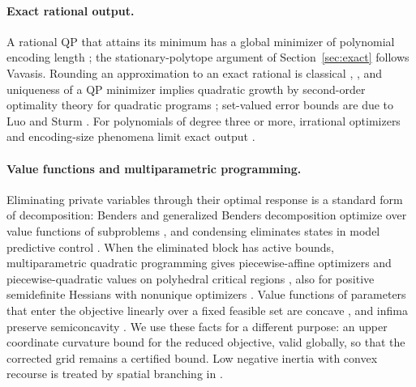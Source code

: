 \paragraph{Exact rational output.}
A rational QP that attains its minimum has a global minimizer of polynomial
encoding length \cite{Vavasis1990,DelPiaDeyMolinaro2017}; the stationary-polytope
argument of Section~\ref{sec:exact} follows Vavasis. Rounding an approximation
to an exact rational is classical
\cite[Section~5.1]{GrotschelLovaszSchrijver1988}, \cite{KozlovTarasovKhachiyan1980},
and uniqueness of a QP minimizer implies quadratic growth by second-order
optimality theory for quadratic programs \cite{Contesse1980}; set-valued error
bounds are due to Luo and Sturm \cite{LuoSturm2000}. For polynomials of degree
three or more, irrational optimizers and encoding-size phenomena limit exact
output \cite{BienstockDelPiaHildebrand2023}.

\paragraph{Value functions and multiparametric programming.}
Eliminating private variables through their optimal response is a standard
form of decomposition: Benders and generalized Benders decomposition optimize
over value functions of subproblems \cite{Benders1962,Geoffrion1972}, and
condensing eliminates states in model predictive control
\cite{BockPlitt1984,JerezKerriganConstantinides2012,Axehill2015}. When the
eliminated block has active bounds, multiparametric quadratic programming
gives piecewise-affine optimizers and piecewise-quadratic values on polyhedral
critical regions \cite{BemporadEtAl2002,TondelJohansenBemporad2003}, also for
positive semidefinite Hessians with nonunique optimizers
\cite{SpjotvoldTondelJohansen2007,PatrinosSarimveis2011}. Value functions of
parameters that enter the objective linearly over a fixed feasible set are
concave \cite{MangasarianRosen1964,FiaccoKyparisis1986}, and infima preserve
semiconcavity \cite{CannarsaSinestrari2004}. We use these facts for a different
purpose: an upper coordinate curvature bound for the reduced objective, valid
globally, so that the corrected grid remains a certified bound. Low negative
inertia with convex recourse is treated by spatial branching in
\cite{Vavasis1992,LuoBaiLimPeng2019}.

